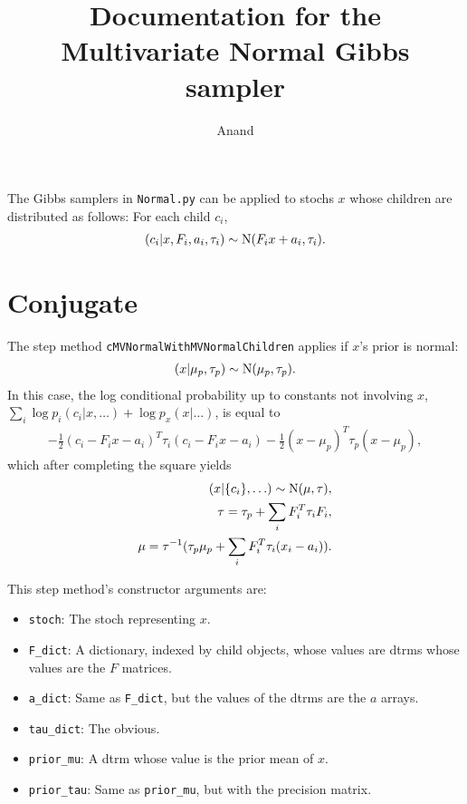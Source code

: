 \documentclass{article}
\begin{document}
\title{Documentation for the Multivariate Normal Gibbs sampler}
\author{Anand}
\maketitle

The Gibbs samplers in \texttt{Normal.py} can be applied to stochs $x$ whose children are distributed as follows: For each child $c_i$,
\begin{eqnarray*}
	(c_i | x, F_i, a_i, \tau_i) \sim \textup{N}(F_i x + a_i, \tau_i).
\end{eqnarray*}

\section{Conjugate}\label{conj}
The step method \texttt{cMVNormalWithMVNormalChildren} applies if $x$'s prior is normal:
\begin{eqnarray*}
	(x|\mu_p,\tau_p) \sim \textup{N}(\mu_p,\tau_p).
\end{eqnarray*}
In this case, the log conditional probability up to constants not involving $x$, $\sum_i \log p_i(c_i|x,\ldots) +\log p_x(x|\ldots)$, is equal to
\begin{eqnarray*}
	-\frac{1}{2}(c_i-F_ix-a_i)^T\tau_i(c_i-F_ix-a_i) - \frac{1}{2}(x-\mu_p)^T\tau_p(x-\mu_p),
\end{eqnarray*}
which after completing the square yields
\begin{eqnarray*}
	(x|\{c_i\},\ldots)\sim\textup{N}(\mu,\tau),\\
	\tau = \tau_p + \sum_i F_i^T \tau_i F_i,\\
	\mu = \tau^{-1}(\tau_p\mu_p + \sum_i F_i^T\tau_i(x_i-a_i)).
\end{eqnarray*}

This step method's constructor arguments are:
\begin{itemize}
	\item \texttt{stoch}: The stoch representing $x$. 
	\item \texttt{F\_dict}: A dictionary, indexed by child objects, whose values are dtrms whose values are the $F$ matrices. 
	\item \texttt{a\_dict}: Same as \texttt{F\_dict}, but the values of the dtrms are the $a$ arrays.
	\item \texttt{tau\_dict}: The obvious.
	\item \texttt{prior\_mu}: A dtrm whose value is the prior mean of $x$.
	\item \texttt{prior\_tau}: Same as \texttt{prior\_mu}, but with the precision matrix.    
\end{itemize}
\end{document}
